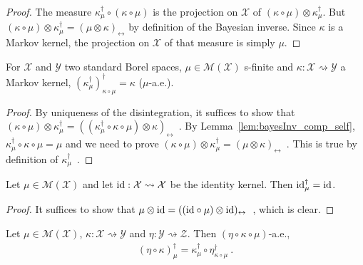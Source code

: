 \begin{proof}\leanok
\uses{}
The measure $\kappa_\mu^\dagger \circ (\kappa \circ \mu)$ is the projection on $\mathcal X$ of $(\kappa \circ \mu) \otimes \kappa_\mu^\dagger$. But $(\kappa \circ \mu) \otimes \kappa_\mu^\dagger = (\mu \otimes \kappa)_\leftrightarrow$ by definition of the Bayesian inverse. Since $\kappa$ is a Markov kernel, the projection on $\mathcal X$ of that measure is simply $\mu$.
\end{proof}

\begin{lemma}
  \label{lem:bayesInv_self}
  \leanok
  For $\mathcal X$ and $\mathcal Y$ two standard Borel spaces, $\mu \in \mathcal M(\mathcal X)$ s-finite and $\kappa : \mathcal X \rightsquigarrow \mathcal Y$ a Markov kernel, $(\kappa_\mu^\dagger)_{\kappa \circ \mu}^\dagger = \kappa$ ($\mu$-a.e.).
\end{lemma}

\begin{proof}\leanok
{}
By uniqueness of the disintegration, it suffices to show that $(\kappa \circ \mu) \otimes \kappa_\mu^\dagger = ((\kappa_\mu^\dagger \circ \kappa \circ \mu) \otimes \kappa)_\leftrightarrow$~.
By Lemma~\ref{lem:bayesInv_comp_self}, $\kappa_\mu^\dagger \circ \kappa \circ \mu = \mu$ and we need to prove $(\kappa \circ \mu) \otimes \kappa_\mu^\dagger = (\mu \otimes \kappa)_\leftrightarrow$~.
This is true by definition of $\kappa_\mu^\dagger$~.
\end{proof}

\begin{lemma}
  \label{lem:bayesInv_id}
  \leanok
  Let $\mu \in \mathcal M (\mathcal X)$ and let $\textup{id} : \mathcal X \rightsquigarrow \mathcal X$ be the identity kernel. Then $\textup{id}_\mu^\dagger = \textup{id}$.
\end{lemma}

\begin{proof}\leanok
{}
It suffices to show that $\mu \otimes \textup{id} = ((\textup{id} \circ \mu) \otimes \textup{id})_\leftrightarrow$~, which is clear.
\end{proof}

\begin{lemma}
  \label{lem:bayesInv_comp}
  \leanok
  Let $\mu \in \mathcal M(\mathcal X)$, $\kappa : \mathcal X \rightsquigarrow \mathcal Y$ and $\eta : \mathcal Y \rightsquigarrow \mathcal Z$. Then $(\eta \circ \kappa \circ \mu)$-a.e.,
  \begin{align*}
  (\eta \circ \kappa)_\mu^\dagger = \kappa_{\mu}^\dagger \circ \eta_{\kappa \circ \mu}^\dagger
  \: .
  \end{align*}
\end{lemma}

